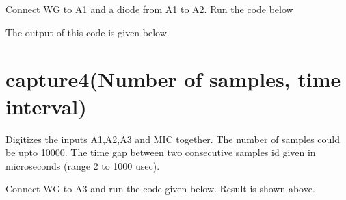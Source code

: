 \documentclass[a4paper,12pt,english]{sphinxmanual}
\let\sphinxpxdimen\pdfpxdimen\else\newdimen\sphinxpxdimen
\begin{document}
Connect WG to A1 and a diode from A1 to A2. Run the code below

\begin{sphinxVerbatim}[commandchars=\\\{\}]
   
 
   
\end{sphinxVerbatim}

The output of this code is given below.

\noindent\sphinxincludegraphics[width=400\sphinxpxdimen]{{halfwave}.pdf}
\noindent\sphinxincludegraphics[width=400\sphinxpxdimen]{{capture4}.pdf}


\section{capture4(Number of samples, time interval)}
\label{\detokenize{9.0:capture4-number-of-samples-time-interval}}
Digitizes the inputs A1,A2,A3 and MIC together. The number of samples
could be upto 10000. The time gap between two consecutive samples id
given in microseconds (range 2 to 1000 usec).

Connect WG to A3 and run the code given below. Result is shown above.

\begin{sphinxVerbatim}[commandchars=\\\{\}]
   
 
   
\PYG{p}{[}\PYG{p}{]}\PYG{p}{[}\PYG{p}{]}        
\PYG{p}{[}\PYG{p}{]}\PYG{p}{[}\PYG{p}{]}        
\end{sphinxVerbatim}
\end{document}
